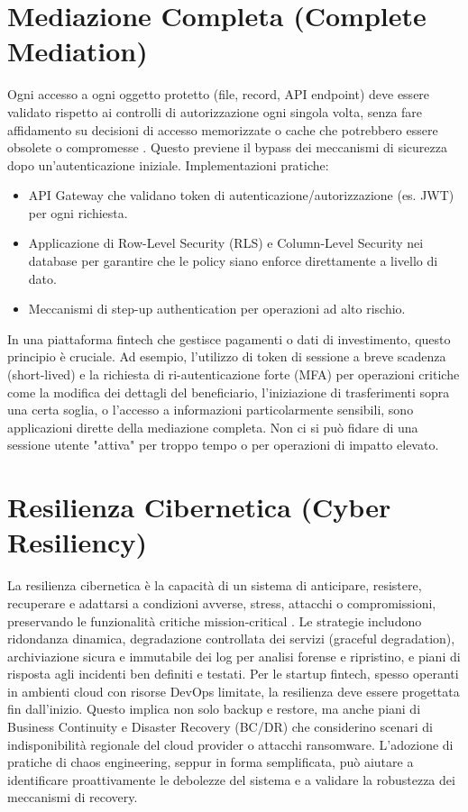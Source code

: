 \section{Mediazione Completa (Complete Mediation)}
Ogni accesso a ogni oggetto protetto (file, record, API endpoint) deve essere validato rispetto ai controlli di autorizzazione ogni singola volta, senza fare affidamento su decisioni di accesso memorizzate o cache che potrebbero essere obsolete o compromesse \cite{Saltzer_Schroeder_1975}. Questo previene il bypass dei meccanismi di sicurezza dopo un'autenticazione iniziale.
Implementazioni pratiche:
\begin{itemize}
\item API Gateway che validano token di autenticazione/autorizzazione (es. JWT) per ogni richiesta.
\item Applicazione di Row-Level Security (RLS) e Column-Level Security nei database per garantire che le policy siano enforce direttamente a livello di dato.
\item Meccanismi di step-up authentication per operazioni ad alto rischio.
\end{itemize}
In una piattaforma fintech che gestisce pagamenti o dati di investimento, questo principio è cruciale. Ad esempio, l'utilizzo di token di sessione a breve scadenza (short-lived) e la richiesta di ri-autenticazione forte (MFA) per operazioni critiche come la modifica dei dettagli del beneficiario, l'iniziazione di trasferimenti sopra una certa soglia, o l'accesso a informazioni particolarmente sensibili, sono applicazioni dirette della mediazione completa. Non ci si può fidare di una sessione utente "attiva" per troppo tempo o per operazioni di impatto elevato.

\section{Resilienza Cibernetica (Cyber Resiliency)}
La resilienza cibernetica è la capacità di un sistema di anticipare, resistere, recuperare e adattarsi a condizioni avverse, stress, attacchi o compromissioni, preservando le funzionalità critiche mission-critical \cite{NIST_SP_800_160v2_2019}. Le strategie includono ridondanza dinamica, degradazione controllata dei servizi (graceful degradation), archiviazione sicura e immutabile dei log per analisi forense e ripristino, e piani di risposta agli incidenti ben definiti e testati.
Per le startup fintech, spesso operanti in ambienti cloud con risorse DevOps limitate, la resilienza deve essere progettata fin dall'inizio. Questo implica non solo backup e restore, ma anche piani di Business Continuity e Disaster Recovery (BC/DR) che considerino scenari di indisponibilità regionale del cloud provider o attacchi ransomware. L'adozione di pratiche di chaos engineering, seppur in forma semplificata, può aiutare a identificare proattivamente le debolezze del sistema e a validare la robustezza dei meccanismi di recovery.

